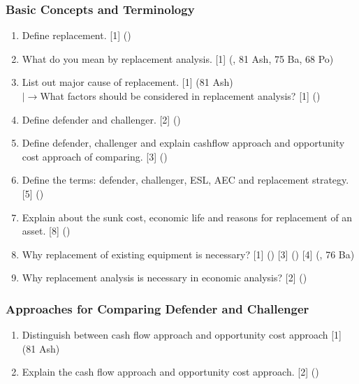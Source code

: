\documentclass[12pt]{article}
\newcommand{\lb}{\\ $\left|\rightarrow\right.$}
\begin{document}
		\subsubsection{Basic Concepts and Terminology}
			\begin{enumerate}[noitemsep, topsep=0pt]
				\item Define replacement. \hfill [1] ()

				\item What do you mean by replacement analysis. \hfill [1] (, 81 Ash, 75 Ba, 68 Po)

				\item List out major cause of replacement. \hfill [1] (81 Ash)
				\lb What factors should be considered in replacement analysis? \hfill [1] ()

				\item Define defender and challenger. \hfill [2] ()

				\item Define defender, challenger and explain cashflow approach and opportunity cost approach of comparing. \hspace{13.9cm} [3] ()

				\item Define the terms: defender, challenger, ESL, AEC and replacement strategy. \hfill [5] ()

				\item Explain about the sunk cost, economic life and reasons for replacement of an asset. \hfill [8] ()

				\item Why replacement of existing equipment is necessary? \hfill [1] () [3] () [4] (, 76 Ba)

				\item Why replacement analysis is necessary in economic analysis? \hfill [2] ()
			\end{enumerate}

		\subsubsection{Approaches for Comparing Defender and Challenger}
			\begin{enumerate}[noitemsep, topsep=0pt]
				\item Distinguish between cash flow approach and opportunity cost approach \hfill [1] (81 Ash)

				\item Explain the cash flow approach and opportunity cost approach. \hfill [2] ()
			\end{enumerate}
\end{document}
